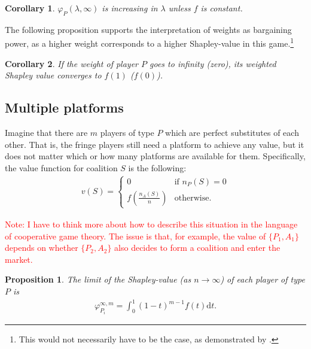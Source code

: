 \documentclass[a4paper]{article}
\newtheorem{proposition}{Proposition}
\newtheorem{corollary}{Corollary}
\newcommand{\dt}{\mathrm{d}t}
\begin{document}
\begin{corollary}
    \label{cor:platform_value_weighted}
    $\varphi_P(\lambda, \infty)$ is increasing in $\lambda$ unless $f$ is constant.
\end{corollary}

The following proposition supports the interpretation of weights as bargaining power, as a higher weight corresponds to a higher Shapley-value in this game.\footnote{This would not necessarily have to be the case, as demonstrated by \textcite{owen1968communications}.}

\begin{corollary}
    \label{cor:paltform_value_weighted_2}
    If the weight of player $P$ goes to infinity (zero), its weighted Shapley value converges to $f(1)$ ($f(0)$).
\end{corollary}

\subsection{Multiple platforms}

Imagine that there are $m$ players of type $P$ which are perfect substitutes of each other. That is, the fringe players still need a platform to achieve any value, but it does not matter which or how many platforms are available for them. Specifically, the value function for coalition $S$ is the following:
\begin{align*}
    v(S) = \begin{cases}
        0                              & \text{if } n_P(S) = 0 \\
        f\left(\frac{n_A(S)}{n}\right) & \text{otherwise}.
    \end{cases}
\end{align*}

\textcolor{red}{Note: I have to think more about how to describe this situation in the language of cooperative game theory. The issue is that, for example, the value of $\{P_1, A_1\}$ depends on whether $\{P_2, A_2\}$ also decides to form a coalition and enter the market.}

\begin{proposition}
    \label{prop:multiple_platforms}
    The limit of the Shapley-value (as $n \to \infty$) of each player of type $P$ is
    \begin{align*}
        \varphi_{P_i}^{\infty, m} = \int_0^1 (1-t) ^ {m-1} f(t) \dt .
    \end{align*}
\end{proposition}
\end{document}
